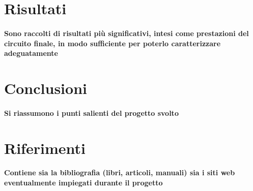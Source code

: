 \documentclass{article}
\begin{document}
\newpage
\section{Risultati}
\paragraph{Sono  raccolti  di  risultati  più  significativi,  intesi  come  prestazioni  del  circuito  finale,  in  modo  sufficiente per poterlo caratterizzare adeguatamente}

\newpage
\section{Conclusioni}
\paragraph{Si riassumono i punti salienti del progetto svolto}

\newpage
\section{Riferimenti}
\paragraph{Contiene  sia  la  bibliografia  (libri,  articoli,  manuali)  sia  i  siti  web  eventualmente  impiegati  durante il progetto}
\end{document}
